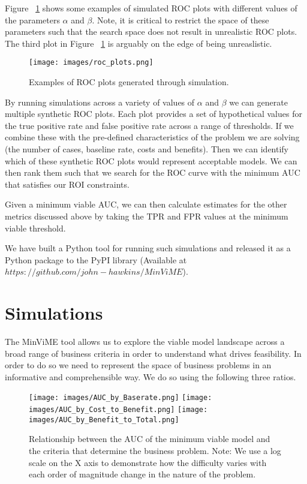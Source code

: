 \documentclass[12pt,a4paper]{article}
\numberwithin{equation}{section}
\begin{document}
Figure ~\ref{fig:ROC} shows some examples of simulated ROC plots with different values of 
the parameters $\alpha$ and $\beta$. Note, it is critical to restrict the space of these parameters such
that the search space does not result in unrealistic ROC plots. The third plot in Figure  ~\ref{fig:ROC}
is arguably on the edge of being unreaslistic. 

\begin{figure}[h!]
\texttt{[image: images/roc\_plots.png]}
\caption{Examples of ROC plots generated through simulation.}
\label{fig:ROC}
\end{figure}


By running simulations across a variety of values of $\alpha$ and $\beta$
we can generate multiple synthetic ROC plots. Each plot provides a set of hypothetical
values for the true positive rate and false positive rate across a range of thresholds.
If we combine these with the pre-defined characteristics of the problem we are solving
(the number of cases, baseline rate, costs and benefits). Then we can identify which
of these synthetic ROC plots would represent acceptable models. We can then rank
them such that we search for the ROC curve with the minimum AUC that satisfies our
ROI constraints.

Given a minimum viable AUC, we can then calculate estimates for the other metrics discussed
above by taking the TPR and FPR values at the minimum viable threshold.

We have built a Python tool for running such simulations and released it as a Python package
to the PyPI library (Available at $https://github.com/john-hawkins/MinViME$). 

\section{Simulations}

The MinViME tool allows us to explore the viable model landscape across a broad range of business
criteria in order to understand what drives feasibility. In order to do so we need to represent
the space of business problems in an informative and comprehensible way. We do so using the following
three ratios.

\begin{figure}[!ht]
\texttt{[image: images/AUC\_by\_Baserate.png]}
\texttt{[image: images/AUC\_by\_Cost\_to\_Benefit.png]}
\texttt{[image: images/AUC\_by\_Benefit\_to\_Total.png]}
\caption{Relationship between the AUC of the minimum viable model and the criteria that determine
the business problem. Note: We use a log scale on the X axis to demonstrate how
the difficulty varies with each order of magnitude change in the nature of the problem.
}
\label{fig:threeplots}
\end{figure}
\end{document}
